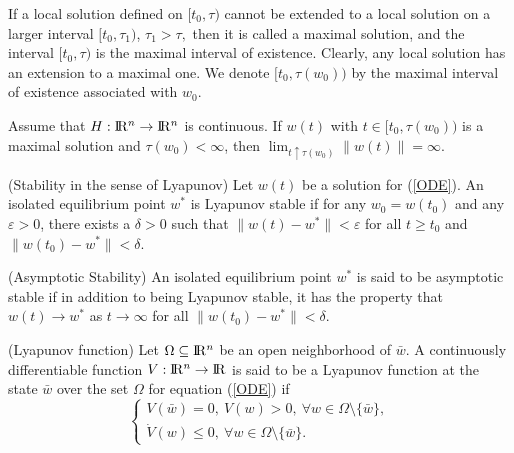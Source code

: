 \documentclass[12pt]{article}
\renewcommand{\Re}{{\rm I}\! {\rm R}}
\newcommand{\ds}{\displaystyle}
\begin{document}
 If a local solution defined on $[t_0,\tau)$ cannot be extended to a
 local solution on a larger interval $[t_0,\tau_1)$, $\tau_1>\tau,$
 then it is called a maximal solution, and the interval $[t_0,\tau)$
 is the maximal interval of existence. Clearly, any local solution
 has an extension to a maximal one. We denote $[t_0, \tau(w_0))$ by
 the maximal interval of existence associated with $w_0$.


 \medskip

 \begin{lemma}\label{limmaxsolution}
 Assume that $H: \Re^n \to \Re^n$ is continuous. If $w(t)$ with
 $t\in [t_0, \tau(w_0))$ is a maximal solution and $\tau(w_0)<\infty$,
 then $\ds \lim_{t\uparrow\tau(w_0)}\|w(t)\|=\infty.$
 \end{lemma}

 \medskip

 \begin{definition} (Stability in the sense of Lyapunov)
 Let $w(t)$ be a solution for (\ref{ODE}). An isolated equilibrium point
 $w^*$ is Lyapunov stable if for any $w_0=w(t_0)$ and any  $\varepsilon >0$,
 there exists a $\delta>0$ such that $\|w(t)-w^*\|<\varepsilon$ for all
 $t\geq t_0$ and $\|w(t_0)-w^*\|<\delta$.
 \end{definition}

 \medskip

 \begin{definition} (Asymptotic Stability)
 An isolated equilibrium point $w^*$ is said to be asymptotic stable
 if in addition to being Lyapunov stable, it has the property that
 $w(t)\to w^*$ as $t\to \infty$ for all $\|w(t_0)-w^*\| < \delta$.
 \end{definition}

 \medskip

 \begin{definition} (Lyapunov function)
 Let $\Omega \subseteq \Re^n$ be an open neighborhood of $\bar{w}$.
 A continuously differentiable function $V:\Re^n\to \Re$ is said to
 be a Lyapunov function at the state $\bar{w}$ over the set $\Omega$
 for equation (\ref{ODE}) if
 \begin{equation} \label{Lfunction}
 \left\{
 \begin{array}{ll}
 V(\bar{w})=0,\ V(w)>0,\ \forall w\in\Omega\setminus\{\bar{w}\}, \\
 \dot{V}(w)\leq 0,\ \forall w\in\Omega\setminus\{\bar{w}\}.
 \end{array}\right.
 \end{equation}
 \end{definition}
\end{document}
